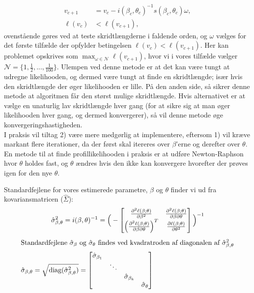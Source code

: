 \documentclass[11pt,a4paper]{article}
\begin{document}
\begin{align*}
    v_{c+1} &= v_{c} -  i(\beta_c,\theta_c)^{-1}s(\beta_c,\theta_c)\omega,\\
    \ell(v_{c}) &< \ell(v_{c+1}),
\end{align*}
ovenstående gøres ved at teste skridtlængderne i faldende orden, og $\omega$ vælges for det første tilfælde der opfylder betingelsen $\ell(v_c)<\ell(v_{c+1})$. 
Her kan problemet opskrives som 
$\max_{\omega \in \mathcal{N}} \ell(v_{c+1})$, hvor vi i vores tilfælde vælger 
$\mathcal{N} = \{1,\frac{1}{2},...,\frac{1}{100}\}$. Ulempen ved denne metode er at det kan være tungt at udregne likelihooden, og dermed være tungt at finde en skridtlængde; især hvis den skridtlængde der øger likelihooden er lille. På den anden side, så sikrer denne metode at algoritmen får den størst mulige skridtlængde. Hvis alternativet er at vælge en unaturlig lav skridtlængde hver gang (for at sikre sig at man øger likelihooden hver gang, og dermed konvergerer), så vil denne metode øge konvergeringshastigheden.\\
I praksis vil tiltag 2) være mere medgørlig at implementere, eftersom 1) vil kræve markant flere iterationer, da der først skal itereres over $\beta$'erne og derefter over $\theta$. En metode til at finde profillikelihooden i praksis er at udføre Newton-Raphson hvor $\theta$ holdes fast, og $\theta$ ændres hvis den ikke kan konvergere hvorefter der prøves igen for den nye $\theta$.\par
Standardfejlene for vores estimerede parametre, $\beta$ og $\theta$ finder vi ud fra kovariansmatricen ($\hat{\Sigma}$): 
\begin{align*}
&\hat{\sigma}^2_{\beta,\theta}=i(\beta,\theta)^{-1}=
\Big{(}-\begin{bmatrix}
\frac{\partial^2 \ell(\beta;\theta)}{\partial \beta^2} &\frac{\partial^2 \ell(\beta;\theta)}{\partial \beta \partial \theta} \\
\Big{(}\frac{\partial^2 \ell(\beta;\theta)}{\partial \beta \partial \theta}\Big{)}^T & \frac{\partial \ell(\beta;\theta)}{\partial \theta^2}
\end{bmatrix}\Big{)}^{-1}\\
\end{align*}
\begin{align}
\intertext{Standardfejlene $\hat{\sigma}_\beta$ og $\hat{\sigma}_\theta$ findes ved kvadratroden af diagonalen af $\hat{\sigma}^2_{\beta,\theta}$}
\hat{\sigma}_{\beta,\theta}=\sqrt{\text{diag}(\hat{\sigma}^2_{\beta,\theta})}=
\begin{bmatrix}
\hat{\sigma}_{\beta_1}& &\\
& \ddots & \\
& & \hat{\sigma}_{\beta_k} \\
& & & \hat{\sigma}_{\theta}
\end{bmatrix}
\end{align}
\end{document}
